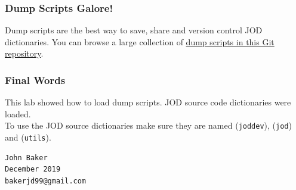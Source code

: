 \documentclass[11pt,letter,landscape]{article}
\begin{document}
    \subsubsection{Dump Scripts Galore!}\label{dump-scripts-galore}

Dump scripts are the best way to save, share and version control JOD
dictionaries. You can browse a large collection of
\href{https://github.com/bakerjd99/joddumps}{dump scripts in this Git
repository}.

    \subsubsection{Final Words}\label{final-words}

This lab showed how to load dump scripts. JOD source code dictionaries
were loaded.\\
To use the JOD source dictionaries make sure they are named
(\texttt{joddev}), (\texttt{jod}) and (\texttt{utils}).

\begin{verbatim}
John Baker
December 2019
bakerjd99@gmail.com
\end{verbatim}


    
    
    
    
\end{document}
